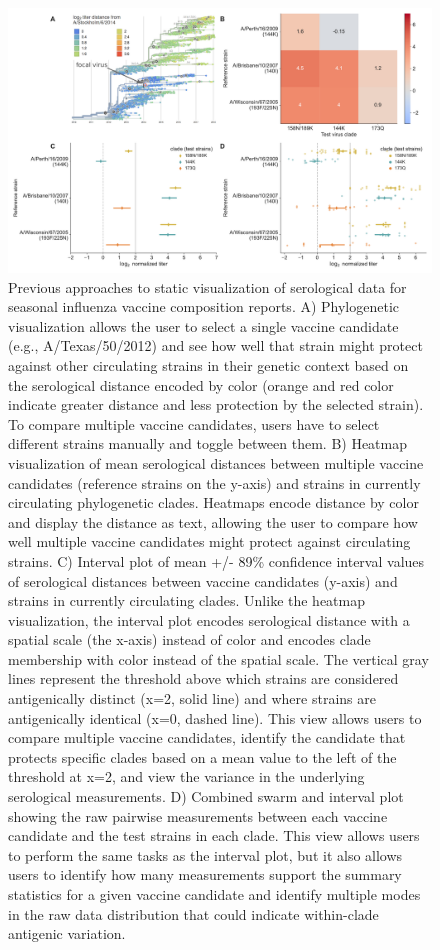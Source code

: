 \documentclass[utf8]{FrontiersinHarvard} %
\begin{document}
\begin{figure}[h!]
  \begin{center}
    \includegraphics[width=\textwidth]{figures/figure-1-static-titer-visualizations}
  \end{center}
  \caption{
    Previous approaches to static visualization of serological data for seasonal influenza vaccine composition reports.
A) Phylogenetic visualization \citep{NeherBedford2018} allows the user to select a single vaccine candidate (e.g., A/Texas/50/2012) and see how well that strain might protect against other circulating strains in their genetic context based on the serological distance encoded by color (orange and red color indicate greater distance and less protection by the selected strain).
To compare multiple vaccine candidates, users have to select different strains manually and toggle between them.
B) Heatmap visualization of mean serological distances between multiple vaccine candidates (reference strains on the y-axis) and strains in currently circulating phylogenetic clades.
Heatmaps encode distance by color and display the distance as text, allowing the user to compare how well multiple vaccine candidates might protect against circulating strains.
C) Interval plot of mean +/- 89\% confidence interval values of serological distances between vaccine candidates (y-axis) and strains in currently circulating clades.
Unlike the heatmap visualization, the interval plot encodes serological distance with a spatial scale (the x-axis) instead of color and encodes clade membership with color instead of the spatial scale.
The vertical gray lines represent the threshold above which strains are considered antigenically distinct (x=2, solid line) and where strains are antigenically identical (x=0, dashed line).
This view allows users to compare multiple vaccine candidates, identify the candidate that protects specific clades based on a mean value to the left of the threshold at x=2, and view the variance in the underlying serological measurements.
D) Combined swarm and interval plot showing the raw pairwise measurements between each vaccine candidate and the test strains in each clade.
This view allows users to perform the same tasks as the interval plot, but it also allows users to identify how many measurements support the summary statistics for a given vaccine candidate and identify multiple modes in the raw data distribution that could indicate within-clade antigenic variation.
}\label{fig:1}
\end{figure}
\end{document}

